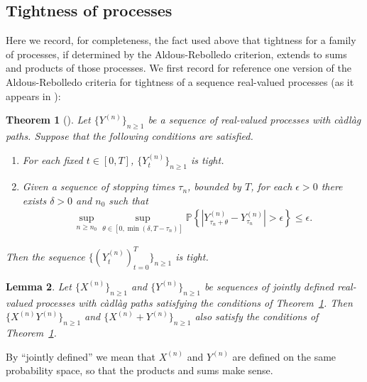 \documentclass[12pt]{article}
\newtheorem{theorem}{Theorem}[section]
\newtheorem{lemma}[theorem]{Lemma}
\newcommand{\IP}{\mathbb P}
\numberwithin{equation}{section}
\begin{document}
\subsection{Tightness of processes}
\label{apx:aldous rebolledo}

Here we record, for completeness, the fact used above
that tightness for a family of processes, if determined by the Aldous-Rebolledo criterion,
extends to sums and products of those processes.
We first record for reference
one version of the Aldous-Rebolledo criteria for tightness of a sequence real-valued processes
(as it appears in \citet{etheridge2000introduction}):

\begin{theorem}[\citet{rebolledo:1980}]
    \label{thm:aldous_rebolledo}
    Let $\{Y^{(n)}\}_{n \ge 1}$ be a sequence of real-valued processes
    with c\`adl\`ag paths.
    Suppose that the following conditions are satisfied.
    \begin{enumerate}
        \item For each fixed $t \in [0,T]$, $\{Y_t^{(n)}\}_{n \ge 1}$  is tight.
        \item Given a sequence of stopping times $\tau_n$, bounded by $T$,
            for each $\epsilon > 0$ there exists $\delta > 0$ and $n_0$ such that
            \begin{align*}
                \sup_{n \ge n_0}
                \sup_{\theta \in [0, \min(\delta,T-\tau_n)]}
                \IP\left\{ \left|
                    Y^{(n)}_{\tau_n + \theta} - Y^{(n)}_{\tau_n}
                \right| > \epsilon
                \right\}
                \le \epsilon .
            \end{align*}
    \end{enumerate}
    Then the sequence $\{(Y^{(n)}_t)_{t=0}^T\}_{n \ge 1}$ is tight.
\end{theorem}

\begin{lemma}
    \label{lem:product_tightness}
    Let $\{X^{(n)}\}_{n \ge 1}$ and $\{Y^{(n)}\}_{n \ge 1}$ be sequences of jointly defined
    real-valued processes with c\`adl\`ag paths
    satisfying the conditions of Theorem~\ref{thm:aldous_rebolledo}.
    Then $\{X^{(n)}Y^{(n)}\}_{n \ge 1}$ and $\{X^{(n)} + Y^{(n)}\}_{n \ge 1}$ also
    satisfy the conditions of Theorem~\ref{thm:aldous_rebolledo}.
\end{lemma}

By ``jointly defined'' we mean that $X^{(n)}$ and $Y^{(n)}$ are defined on the same
probability space, so that the products and sums make sense.
\end{document}

